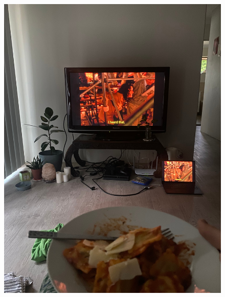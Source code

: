\documentclass[]{article}
\begin{document}
\newpage\begin{figure}[H]
\begin{center}\hyperref[rec:Ravioli (ready meal)]{\includegraphics[keepaspectratio,width=\textwidth,height=\textheight]{Gallery/Ravioli (ready meal)}}\caption*{}\label{fig:Ravioli (ready meal)}\end{center}
\end{figure}
\end{document}
